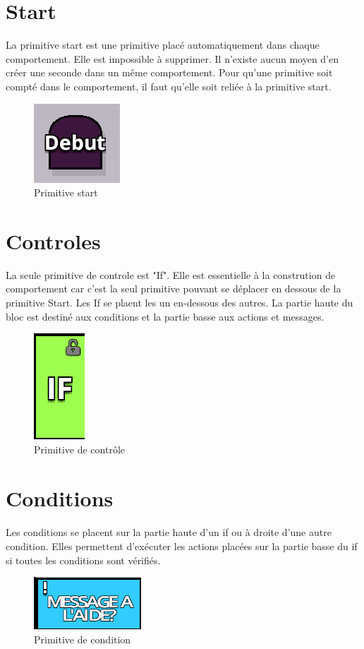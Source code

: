 \documentclass{report}
\begin{document}
\section{Start}
La primitive start est une primitive placé automatiquement dans chaque comportement. Elle est impossible à supprimer. Il n'existe aucun moyen d'en créer une seconde dans un même comportement. Pour qu'une primitive soit compté dans le comportement, il faut qu'elle soit reliée à la primitive start.
 \begin{figure}[!h]
	\centering
		\includegraphics[scale=1]{start.png}
	\caption{Primitive start}
\end{figure}
\section{Controles}
La seule primitive de controle est "If". Elle est essentielle à la constrution de comportement car c'est la seul primitive pouvant se déplacer en dessous de la primitive Start.\newline
Les If se plaent les un en-dessous des autres. La partie haute du bloc est destiné aux conditions et la partie basse aux actions et messages.
\begin{figure}[!h]
	\centering
		\includegraphics[scale=1]{if.png}
	\caption{Primitive de contrôle}
\end{figure}
\paragraph{}
\newpage
\section{Conditions}
\paragraph{}
Les conditions se placent sur la partie haute d'un if ou à droite d'une autre condition. Elles permettent d'exécuter les actions placées sur la partie basse du if si toutes les conditions sont vérifiés.
\begin{figure}[!h]
	\centering
		\includegraphics[scale=1]{cond.png}
	\caption{Primitive de condition}
\end{figure}
\end{document}
